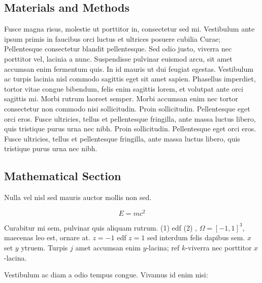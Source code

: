 \documentclass[a0,landscape]{a0poster}
\begin{document}
\begin{multicols}{4}

    \section*{Materials and Methods}

    Fusce magna risus, molestie ut porttitor in, consectetur sed mi. Vestibulum ante ipsum primis in faucibus orci luctus et ultrices posuere cubilia Curae; Pellentesque consectetur blandit pellentesque. Sed odio justo, viverra nec porttitor vel, lacinia a nunc. Suspendisse pulvinar euismod arcu, sit amet accumsan enim fermentum quis. In id mauris ut dui feugiat egestas. Vestibulum ac turpis lacinia nisl commodo sagittis eget sit amet sapien. Phasellus imperdiet, tortor vitae congue bibendum, felis enim sagittis lorem, et volutpat ante orci sagittis mi. Morbi rutrum laoreet semper. Morbi accumsan enim nec tortor consectetur non commodo nisi sollicitudin. Proin sollicitudin. Pellentesque eget orci eros. Fusce ultricies, tellus et pellentesque fringilla, ante massa luctus libero, quis tristique purus urna nec nibh. Proin sollicitudin. Pellentesque eget orci eros. Fusce ultricies, tellus et pellentesque fringilla, ante massa luctus libero, quis tristique purus urna nec nibh.


    \subsection*{Mathematical Section}

    Nulla vel nisl sed mauris auctor mollis non sed.

    \begin{equation}
        E = mc^{2}
        \label{eqn:Einstein}
    \end{equation}

    Curabitur mi sem, pulvinar quis aliquam rutrum. (1) edf (2)
    , $\Omega=[-1,1]^3$, maecenas leo est, ornare at. $z=-1$ edf $z=1$ sed interdum felis dapibus sem. $x$ set $y$ ytruem.
    Turpis $j$ amet accumsan enim $y$-lacina;
    ref $k$-viverra nec porttitor $x$-lacina.

    Vestibulum ac diam a odio tempus congue. Vivamus id enim nisi:


\end{multicols}
\end{document}

